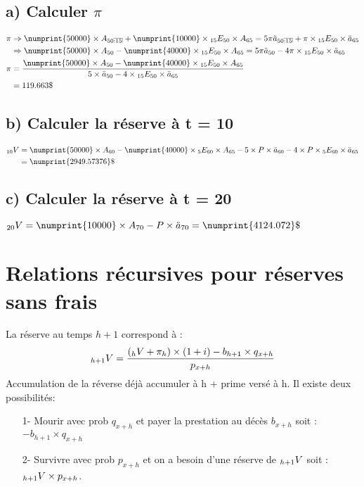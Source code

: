 \documentclass[11pt,french]{report}
\makeatletter
\DeclareRobustCommand{\annuity}[1]{%
\def\arraystretch{0}%
\setlength\arraycolsep{.7pt}%
\setlength\arrayrulewidth{.3pt}%
\begin{array}[b]{@{}c|}\hline
\\[\arraycolsep]%
\scriptstyle #1%
\end{array}%
}
\newcommand{\indiceGauche}[2]{{\vphantom{#2}}_{#1}#2}
\makeatother
\begin{document}
\subsection*{a) Calculer $\pi$}
\begin{align*}
\pi &\Rightarrow \numprint{50000}\times A_{50\annuity{:15}} + \numprint{10000}\times \indiceGauche{15}{E}_{50}\times A_{65} = 5\pi\ddot{a}_{50\annuity{:15}} + \pi\times \indiceGauche{15}{E}_{50}\times\ddot{a}_{65} \\
&\Rightarrow \numprint{50000}\times A_{50} - \numprint{40000}\times \indiceGauche{15}{E}_{50}\times A_{65} = 5\pi\ddot{a}_{50} - 4\pi\times \indiceGauche{15}{E}_{50}\times \ddot{a}_{65} \\
\pi &= \frac{\numprint{50000}\times A_{50} - \numprint{40000}\times \indiceGauche{15}{E}_{50}\times A_{65}}{5\times \ddot{a}_{50} - 4 \times \indiceGauche{15}{E}_{50}\times \ddot{a}_{65}} \\
&=119.663\$
\end{align*}

\subsection*{b) Calculer la réserve à t = 10}
\begin{align*}
\indiceGauche{10}{V} &= \numprint{50000}\times A_{60} - \numprint{40000}\times  \indiceGauche{5}{E}_{60}\times A_{65} - 5\times P\times \ddot{a}_{60} - 4\times P\times\indiceGauche{5}{E}_{60} \times \ddot{a}_{65} \\
&= \numprint{2949.57376}\$
\end{align*}

\subsection*{c) Calculer la réserve à t = 20}
$\indiceGauche{20}{V} = \numprint{10000} \times A_{70} - P \times \ddot{a}_{70} = \numprint{4124.072}\$ $

\section{Relations récursives pour réserves sans frais}
La réserve au temps $h + 1 $ correspond à :
\begin{equation}
\indiceGauche{h + 1}{V} = \frac{(\indiceGauche{h}{V} + \pi_{h} )\times (1+i) - b_{h+1}\times q_{x+h}}{p_{x+h}}
\end{equation}
Accumulation de la réverse déjà accumuler à h + prime versé à h. Il existe deux possibilités:
\begin{enumerate}
\item[1-] Mourir avec prob $q_{x+h}$ et payer la prestation au décès $b_{x+h}$ soit : $ - b_{h+1}\times q_{x+h}$
\item[2-]Survivre avec prob $p_{x+h}$ et on a besoin d'une réserve de $\indiceGauche{h + 1}{V}$ soit : $\indiceGauche{h + 1}{V} \times p_{x+h}$.
\end{enumerate}
\end{document}
